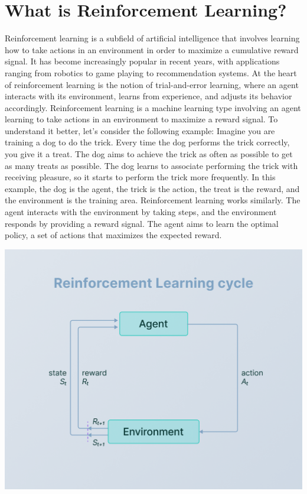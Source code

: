 \documentclass{article}
\begin{document}
\section{What is Reinforcement Learning?}
Reinforcement learning is a subfield of artificial intelligence that involves learning how to take actions in an environment in order to maximize a cumulative reward signal. It has become increasingly popular in recent years, with applications ranging from robotics to game playing to recommendation systems. At the heart of reinforcement learning is the notion of trial-and-error learning, where an agent interacts with its environment, learns from experience, and adjusts its behavior accordingly. Reinforcement learning is a machine learning type involving an agent learning to take actions in an environment to maximize a reward signal. To understand it better, let's consider the following example:
Imagine you are training a dog to do the trick. Every time the dog performs the trick correctly, you give it a treat. The dog aims to achieve the trick as often as possible to get as many treats as possible. The dog learns to associate performing the trick with receiving pleasure, so it starts to perform the trick more frequently.
In this example, the dog is the agent, the trick is the action, the treat is the reward, and the environment is the training area. Reinforcement learning works similarly. The agent interacts with the environment by taking steps, and the environment responds by providing a reward signal. The agent aims to learn the optimal policy, a set of actions that maximizes the expected reward.

\begin{center}
    \includegraphics[scale = 0.55]{rlcycle.png}
\end{center}
\end{document}
